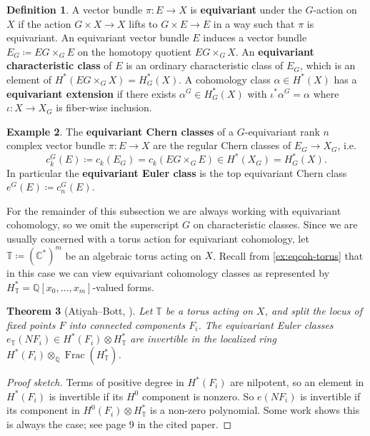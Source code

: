 \documentclass{report}
\theoremstyle{plain}
\newtheorem{theorem}{Theorem}[section]
\theoremstyle{definition}
\newtheorem{definition}[theorem]{Definition}
\newtheorem{example}[theorem]{Example}
\theoremstyle{remark}
\newcommand{\bC}{\mathbb{C}}
\newcommand{\bT}{\mathbb{T}}
\newcommand{\bQ}{\mathbb{Q}}
\DeclareMathOperator{\Frac}{Frac}
\begin{document}
\begin{definition}
  A vector bundle $\pi\colon E \to X$ is {\bf equivariant} under the
  $G$-action on $X$ if the action $G \times X \to X$ lifts to $G
  \times E \to E$ in a way such that $\pi$ is equivariant. An
  equivariant vector bundle $E$ induces a vector bundle $E_G \coloneqq
  EG \times_G E$ on the homotopy quotient $EG \times_G X$. An {\bf
    equivariant characteristic class} of $E$ is an ordinary
  characteristic class of $E_G$, which is an element of $H^*(EG
  \times_G X) = H^*_G(X)$. A cohomology class $\alpha \in H^*(X)$ has
  a {\bf equivariant extension} if there exists $\alpha^G \in
  H^*_G(X)$ with $\iota^*\alpha^G = \alpha$ where $\iota\colon X \to
  X_G$ is fiber-wise inclusion.
\end{definition}

\begin{example}
  The {\bf equivariant Chern classes} of a $G$-equivariant rank $n$
  complex vector bundle $\pi\colon E \to X$ are the regular Chern
  classes of $E_G \to X_G$, i.e.
  \[ c_k^G(E) \coloneqq c_k(E_G) = c_k(EG \times_G E) \in H^*(X_G) = H^*_G(X). \]
  In particular the {\bf equivariant Euler class} is the top
  equivariant Chern class $e^G(E) \coloneqq c_n^G(E)$.
\end{example}

For the remainder of this subsection we are always working with
equivariant cohomology, so we omit the superscript $G$ on
characteristic classes. Since we are usually concerned with a torus
action for equivariant cohomology, let $\bT \coloneqq (\bC^*)^m$ be an
algebraic torus acting on $X$. Recall from \ref{ex:eqcoh-torus} that
in this case we can view equivariant cohomology classes as represented
by $H^*_{\bT} = \bQ[x_0, \ldots, x_m]$-valued forms.

\begin{theorem}[Atiyah--Bott, \cite{Atiyah1984}]
  Let $\bT$ be a torus acting on $X$, and split the locus of fixed
  points $F$ into connected components $F_i$. The equivariant Euler
  classes $e_{\bT}(NF_i) \in H^*(F_i) \otimes H^*_{\bT}$ are
  invertible in the localized ring $H^*(F_i) \otimes_{\bQ}
  \Frac(H^*_{\bT})$.
\end{theorem}

\begin{proof}[Proof sketch]
  Terms of positive degree in $H^*(F_i)$ are nilpotent, so an element
  in $H^*(F_i)$ is invertible if its $H^0$ component is nonzero. So
  $e(NF_i)$ is invertible if its component in $H^0(F_i) \otimes
  H^*_{\bT}$ is a non-zero polynomial. Some work shows this is always
  the case; see page 9 in the cited paper.
\end{proof}
\end{document}
